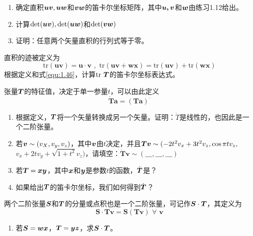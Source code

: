 \begin{exercise}
    \item \begin{enumerate}
        \item 确定直积$\boldsymbol{uv},\boldsymbol{uw}$和$\boldsymbol{vw}$的笛卡尔坐标矩阵，其中$\boldsymbol{u,v}$和$\boldsymbol{w}$由练习1.12给出。
        \item 计算$\det(\boldsymbol{uv}),\det(\boldsymbol{uw})$和$\det(\boldsymbol{vw})$
        \item 证明：任意两个矢量直积的行列式等于零。
    \end{enumerate}
    \item 直积的迹被定义为
    \begin{equation*}
        \mathrm{tr}\left( \boldsymbol{uv} \right) =\boldsymbol{u}\cdot \boldsymbol{v}\,\, , \,\, \mathrm{tr}\left( \boldsymbol{uv}+\boldsymbol{wx} \right) =\mathrm{tr}\left( \boldsymbol{uv} \right) +\mathrm{tr}\left( \boldsymbol{wx} \right) 
    \end{equation*}
    根据定义和式\eqref{equ:1.46}，计算$\mathrm{tr}~ \boldsymbol{T}$的笛卡尔坐标表达式。
    \item 张量$\boldsymbol{T}$的特征值，决定于单一参量$t$，可以由此定义
    \begin{equation}
        \dot{\boldsymbol{T}}\boldsymbol{a}=\left( \boldsymbol{Ta} \right) ^{\cdot}
    \end{equation}
    \begin{enumerate}
        \item 根据定义，$\boldsymbol{T}$将一个矢量转换成另一个矢量。证明：$\dot{T}$是线性的，也因此是一个二阶张量。
        \item 若$\boldsymbol{v}\sim (v_X,v_y,v_z)$，其中$\boldsymbol{v}$由$t$决定，并且$\boldsymbol{Tv}\sim ( -2t^2v_x+3t^2v_z , \cos \pi tv_z ,$$ v_x+2tv_y+\sqrt{1+t^2}v_z ) $，请填空：$\dot{\boldsymbol{T}}\boldsymbol{v}\sim \left( \_\_\_,\_\_\_,\_\_\_ \right) $
        \item 若$\boldsymbol{T}=\boldsymbol{xy}$，其中$\boldsymbol{x}$和$\boldsymbol{y}$是参数$t$的函数，$\dot{\boldsymbol{T}}$是？
        \item 如果给出$\boldsymbol{T}$的笛卡尔坐标，我们如何得到$\dot{\boldsymbol{T}}$？
    \end{enumerate}
    \item 两个二阶张量$\boldsymbol{S}$和$\boldsymbol{T}$的分量或点积也是一个二阶张量，可记作$\boldsymbol{S}\cdot \boldsymbol{T}$，其定义为
    \begin{equation*}
        \boldsymbol{S}\cdot \boldsymbol{Tv}=\boldsymbol{S}\left( \boldsymbol{Tv} \right) \,\, \forall \,\,\boldsymbol{v}
    \end{equation*}
    \begin{enumerate}
        \item 若$\boldsymbol{S}=\boldsymbol{wx}$，$\boldsymbol{T}=\boldsymbol{yz}$，求$\boldsymbol{S}\cdot \boldsymbol{T}$。

\end{enumerate}
\end{exercise}
